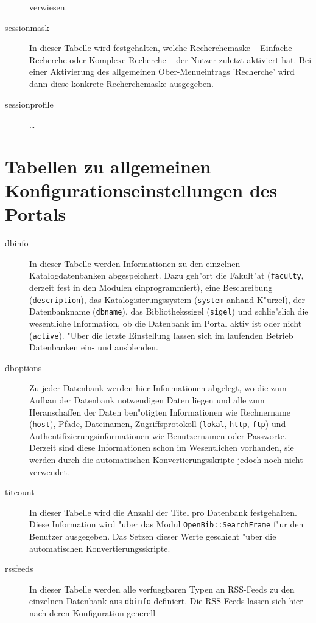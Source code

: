 \documentclass[11pt, twoside, a4paper, BCOR8mm, DIV12, bibtotoc,idxtotoc]{scrbook}
\begin{document}
\begin{description}
  verwiesen.
\item[sessionmask] In dieser Tabelle wird festgehalten, welche
  Recherchemaske -- Einfache Recherche oder Komplexe Recherche -- der
  Nutzer zuletzt aktiviert hat. Bei einer Aktivierung des allgemeinen
  Ober-Menueintrags 'Recherche' wird dann diese konkrete
  Recherchemaske aus\-ge\-ge\-ben.
\item[sessionprofile] \dots
\end{description}

\section{Tabellen zu allgemeinen Konfigurationseinstellungen des Portals}

\begin{description}
\item[dbinfo] In dieser Tabelle werden Informationen zu den einzelnen
  Katalogdatenbanken ab\-ge\-spei\-chert. Dazu geh"ort die Fakult"at
  (\texttt{faculty}, derzeit fest in den Modulen einprogrammiert),
  eine Beschreibung (\texttt{description}), das Katalogisierungssystem
  (\texttt{system} anhand K"urzel), der Datenbankname
  (\texttt{dbname}), das Bibliothekssigel (\texttt{sigel}) und
  schlie"slich die wesentliche Information, ob die Daten\-bank im Portal
  aktiv ist oder nicht (\texttt{active}). "Uber die letzte Einstellung
  lassen sich im laufenden Betrieb Daten\-banken ein- und ausblenden.
\item[dboptions] Zu jeder Daten\-bank werden hier Informationen
  abgelegt, wo die zum Aufbau der Daten\-bank notwendigen Daten liegen
  und alle zum Heranschaffen der Daten ben"otigten Informationen wie
  Rechnername (\texttt{host}), Pfade, Dateinamen, Zugriffsprotokoll
  (\texttt{lokal}, \texttt{http}, \texttt{ftp}) und
  Authentifizierungsinformationen wie Benutzernamen oder Passworte.
  Derzeit sind diese Informationen schon im Wesentlichen vorhanden,
  sie werden durch die automatischen Konvertierungsskripte jedoch noch
  nicht verwendet.
\item[titcount] In dieser Tabelle wird die Anzahl der Titel pro
  Daten\-bank festgehalten. Diese Information wird "uber das Modul
  \texttt{OpenBib::SearchFrame} f"ur den Benutzer ausgegeben. Das Setzen
  dieser Werte geschieht "uber die automatischen
  Konvertierungsskripte.
\item[rssfeeds] In dieser Tabelle werden alle verfuegbaren Typen an RSS-Feeds
  zu den einzelnen Daten\-bank aus \texttt{dbinfo} definiert. Die
  RSS-Feeds lassen sich hier nach deren Konfiguration generell

\end{description}
\end{document}

